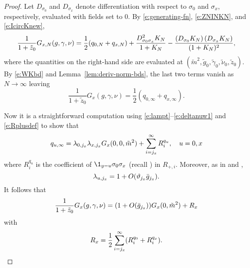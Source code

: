 \begin{proof}
Let $D_{\sigma_0}$ and $D_{\sigma_x}$ denote differentiation with respect to
$\sigma_0$ and $\sigma_x$, respectively, evaluated with fields set to $0$.
By \eqref{e:generating-fn}, \eqref{e:ZNINKN}, and \eqref{e:IcircKnew},
\begin{equation}
\lbeq{GK}
\frac{1}{1+\tilde z_0} G_{x,N}(g,\gamma,\nu)
	=
\frac{1}{2} (q_{0,N} + q_{x,N})
	+
\frac{D^2_{\sigma_0\sigma_x}K_{N}}{1 + K_{N}}
	-
\frac{\left(D_{\sigma_0}K_{N}\right) \left(D_{\sigma_x}K_{N}\right)}{(1 + K_{N})^2},
\end{equation}
where the quantities on the right-hand side are evaluated at
$(\tilde m^2, \tilde g_0, \tilde\gamma_0, \tilde\nu_0, \tilde z_0)$.
By \eqref{e:WKbd} and Lemma~\ref{lem:deriv-norm-bds}, the last two terms
vanish as $N \to \infty$ leaving
\begin{equation}
\frac{1}{1+\tilde z_0} G_x(g, \gamma, \nu) = \frac{1}{2} (q_{0,\infty} + q_{x,\infty}).
\end{equation}

Now it is a straightforward computation using \eqref{e:lampt}--\eqref{e:deltanuw1}
and \eqref{e:Rplusdef} to show that
\begin{equation}
\label{e:q}
q_{u,\infty}
	=
\lambda_{0, j_x} \lambda_{x, j_x}  G_x(0, 0, \tilde m^2)
	+
\sum_{i = j_x}^\infty R^{q_u}_i,
\quad u = 0, x
\end{equation}
where $R^{q_u}_i$ is the coefficient of $\1_{y=u}\sigma_0\sigma_x$
(recall ) in $R_{+,i}$.
Moreover, as in \cite[\eqref{phi4-e:lam-star}]{ST-phi4} and \cite[Corollary~\ref{phi4-cor:vx}]{ST-phi4},
\begin{equation}
\lambda_{u,j_x} = 1 + O(\vartheta_{j_x} \bar{g}_{j_x}).
\end{equation}
It follows that
\begin{equation}
\frac{1}{1+\tilde z_0} G_x(g, \gamma, \nu)
	=
(1 + O(\bar{g}_{j_x})) G_x(0, \tilde m^2) + R_x
\end{equation}
with
\begin{equation}
\label{e:Rabdef}
R_x = \frac{1}{2} \sum_{i=j_x}^\infty (R^{q_0}_i + R^{q_x}_i).
\end{equation}


\end{proof}
